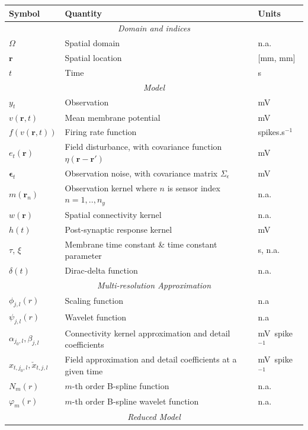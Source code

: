 \documentclass[review,authoryear,3p]{elsarticle}
\begin{document}
\begin{table}[!t]
\begin{tabular}{|l|l|l|}
	\hline
	\textbf{Symbol} & \textbf{Quantity} & \textbf{Units}\\
	\hline
	\multicolumn{3}{|c|}{\emph{Domain and indices}}\\
	\hline
	$\Omega$ & Spatial domain & n.a.\\
	$\mathbf{r}$ & Spatial location & [mm, mm]\\
	$t$ & Time & s\\
	\hline
	\multicolumn{3}{|c|}{\emph{Model}}\\
	\hline
    $y_t$ & Observation & mV\\
    $v(\mathbf{r},t)$ & Mean membrane potential & mV \\
	$f(v\left(\mathbf{r},t\right))$ & Firing rate function & spikes.s$^{-1}$\\
	$e_t(\mathbf{r})$ & Field disturbance, with covariance function $\eta(\mathbf r-\mathbf r')$ & mV\\
	$\boldsymbol\epsilon_t$ & Observation noise, with covariance matrix $\Sigma_\epsilon$ & mV\\
	$m(\mathbf{r}_n)$ & Observation kernel where $n$ is sensor index $n=1,..,n_y$ & n.a. \\
	$w(\mathbf{r})$ & Spatial connectivity kernel & n.a.\\
	$h(t)$ & Post-synaptic response kernel & mV\\
	$\tau$, $\xi$ & Membrane time constant \& time constant parameter & s, n.a.\\
	$\delta(t)$ & Dirac-delta function & n.a.\\
	\hline    
	\multicolumn{3}{|c|}{\emph{Multi-resolution Approximation}} \\
	\hline                                                   
	$\phi_{j,l}(r)$&Scaling function&n.a\\
	$\psi_{j,l}(r)$&Wavelet function&n.a\\  
	$\alpha_{j_0,l}, \beta_{j,l}$&Connectivity kernel approximation and detail coefficients&mV~spike$^{-1}$\\ 
	$x_{t,j_{0},l},\check{x}_{t,j,l}$&Field approximation and detail coefficients at a given time&mV~spike$^{-1}$\\ 
	$N_m(r)$&$m$-th order B-spline function&n.a.\\
	$\varphi_m(r)$&$m$-th order B-spline wavelet function&n.a.\\
	\hline
	\multicolumn{3}{|c|}{\emph{Reduced Model}} \\

\end{tabular}
\end{table}
\end{document}
